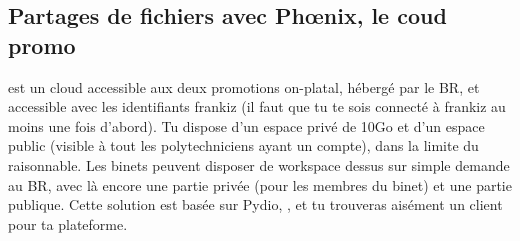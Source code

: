 \subsection{Partages de fichiers avec Phœnix, le coud promo}
\label{phoenix}
 est un cloud accessible aux deux promotions on-platal,
hébergé par le BR, et accessible avec les identifiants frankiz
(il faut que tu te sois connecté à frankiz au moins une fois d'abord).
Tu dispose d'un espace privé de 10Go et d'un espace public (visible à tout les polytechniciens ayant un compte),
dans la limite du raisonnable. Les binets peuvent disposer de workspace dessus sur simple demande au BR,
avec là encore une partie privée (pour les membres du binet) et une partie publique.
Cette solution est basée sur Pydio, , 
et tu trouveras aisément un client pour ta plateforme.

